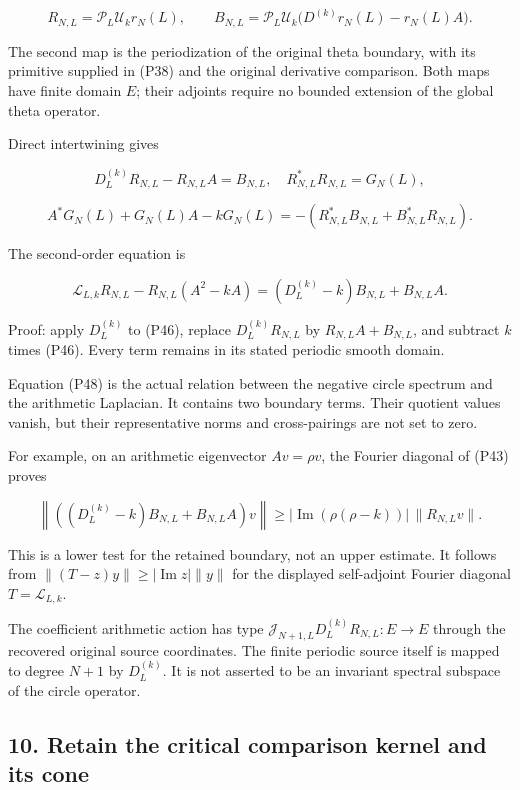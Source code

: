 \[
R_{N,L}=\mathcal P_L\mathcal U_k r_N(L),\qquad
B_{N,L}=\mathcal P_L\mathcal U_k
\bigl(D^{(k)}r_N(L)-r_N(L)A\bigr).
\tag{P45}
\]

The second map is the periodization of the original theta boundary, with its primitive supplied in (P38) and the original derivative comparison. Both maps have finite domain \(E\); their adjoints require no bounded extension of the global theta operator.

Direct intertwining gives

\[
D_L^{(k)}R_{N,L}-R_{N,L}A=B_{N,L},
\quad R_{N,L}^*R_{N,L}=G_N(L),
\tag{P46}
\]

\[
A^*G_N(L)+G_N(L)A-kG_N(L)
=-(R_{N,L}^*B_{N,L}+B_{N,L}^*R_{N,L}).
\tag{P47}
\]

The second-order equation is

\[
\boxed{\mathscr L_{L,k}R_{N,L}-R_{N,L}(A^2-kA)
=(D_L^{(k)}-k)B_{N,L}+B_{N,L}A.}
\tag{P48}
\]

Proof: apply \(D_L^{(k)}\) to (P46), replace \(D_L^{(k)}R_{N,L}\) by \(R_{N,L}A+B_{N,L}\), and subtract \(k\) times (P46). Every term remains in its stated periodic smooth domain.

Equation (P48) is the actual relation between the negative circle spectrum and the arithmetic Laplacian. It contains two boundary terms. Their quotient values vanish, but their representative norms and cross-pairings are not set to zero.

For example, on an arithmetic eigenvector \(Av=\rho v\), the Fourier diagonal of (P43) proves

\[
\left\|((D_L^{(k)}-k)B_{N,L}+B_{N,L}A)v\right\|
\ge |\operatorname{Im}(\rho(\rho-k))|\,\|R_{N,L}v\|.
\tag{P49}
\]

This is a lower test for the retained boundary, not an upper estimate. It follows from \(\| (T-z)y\|\ge|\operatorname{Im}z|\|y\|\) for the displayed self-adjoint Fourier diagonal \(T=\mathscr L_{L,k}\).

The coefficient arithmetic action has type \(\mathcal J_{N+1,L}D_L^{(k)}R_{N,L}:E\to E\) through the recovered original source coordinates. The finite periodic source itself is mapped to degree \(N+1\) by \(D_L^{(k)}\). It is not asserted to be an invariant spectral subspace of the circle operator.

\subsection{10. Retain the critical comparison kernel and its cone}\label{endpoint-periodized_original--retain-the-critical-comparison-kernel-and-its-cone}

